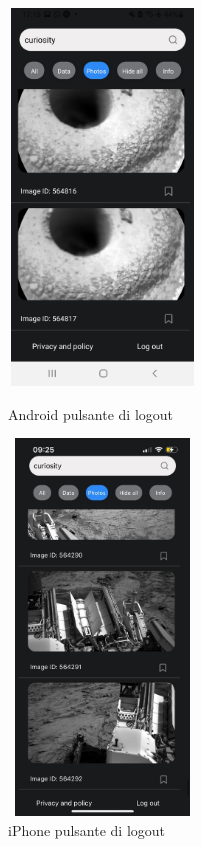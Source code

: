 \begin{figure}[H]
    \begin{minipage}[h]{0.47\textwidth}
        \centering
        \includegraphics[width=5cm, height=10cm]{images/immaginiAndroid/logout.jpg}
        \caption{\label{logoutAndroid} Android pulsante di logout}
    \end{minipage}
    \hfill
    \begin{minipage}[h]{0.47\textwidth}
        \centering
        \includegraphics[width=5cm, height=10cm]{images/immaginiPhone/logout.jpeg}
        \caption{\label{logoutIphone} iPhone pulsante di logout}
    \end{minipage}
\end{figure}
